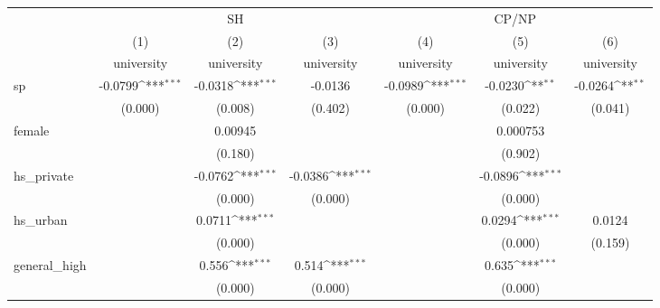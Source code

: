 \documentclass[11pt, letterpaper]{article}
\begin{document}
\centering

{
\def\sym#1{\ifmmode^{#1}\else\(^{#1}\)\fi}
\centering
\begin{tabular}{l*{6}{c}}
    &\multicolumn{3}{c}{SH} &\multicolumn{3}{c}{CP/NP} \\
    \cmidrule(l){2-4}\cmidrule(l){5-7}
            &\multicolumn{1}{c}{(1)}&\multicolumn{1}{c}{(2)}&\multicolumn{1}{c}{(3)}&\multicolumn{1}{c}{(4)}&\multicolumn{1}{c}{(5)}&\multicolumn{1}{c}{(6)}\\
            &\multicolumn{1}{c}{university}&\multicolumn{1}{c}{university}&\multicolumn{1}{c}{university}&\multicolumn{1}{c}{university}&\multicolumn{1}{c}{university}&\multicolumn{1}{c}{university}\\
\hline
sp          &     -0.0799\sym{***}&     -0.0318\sym{***}&     -0.0136         &     -0.0989\sym{***}&     -0.0230\sym{**} &     -0.0264\sym{**} \\
            &     (0.000)         &     (0.008)         &     (0.402)         &     (0.000)         &     (0.022)         &     (0.041)         \\
[1em]
female      &                     &     0.00945         &                     &                     &    0.000753         &                     \\
            &                     &     (0.180)         &                     &                     &     (0.902)         &                     \\
[1em]
hs\_private  &                     &     -0.0762\sym{***}&     -0.0386\sym{***}&                     &     -0.0896\sym{***}&                     \\
            &                     &     (0.000)         &     (0.000)         &                     &     (0.000)         &                     \\
[1em]
hs\_urban    &                     &      0.0711\sym{***}&                     &                     &      0.0294\sym{***}&      0.0124         \\
            &                     &     (0.000)         &                     &                     &     (0.000)         &     (0.159)         \\
[1em]
general\_high&                     &       0.556\sym{***}&       0.514\sym{***}&                     &       0.635\sym{***}&                     \\
            &                     &     (0.000)         &     (0.000)         &                     &     (0.000)         &                     \\

\end{tabular}}
\end{document}
